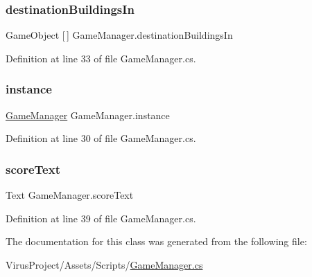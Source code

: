 \subsubsection{\texorpdfstring{destination\+Buildings\+In}{destinationBuildingsIn}}
{\footnotesize\ttfamily Game\+Object \mbox{[}$\,$\mbox{]} Game\+Manager.\+destination\+Buildings\+In}



Definition at line 33 of file Game\+Manager.\+cs.

\hypertarget{class_game_manager_a7666e8468dac197b9eb32dd32128524f}{}\label{class_game_manager_a7666e8468dac197b9eb32dd32128524f} 
\subsubsection{\texorpdfstring{instance}{instance}}
{\footnotesize\ttfamily \hyperlink{class_game_manager}{Game\+Manager} Game\+Manager.\+instance\hspace{0.3cm}{\ttfamily [static]}}



Definition at line 30 of file Game\+Manager.\+cs.

\hypertarget{class_game_manager_a398d163978e15786ef9cea1be1c877d9}{}\label{class_game_manager_a398d163978e15786ef9cea1be1c877d9} 
\subsubsection{\texorpdfstring{score\+Text}{scoreText}}
{\footnotesize\ttfamily Text Game\+Manager.\+score\+Text}



Definition at line 39 of file Game\+Manager.\+cs.



The documentation for this class was generated from the following file\+:\begin{DoxyCompactItemize}
\item 
Virus\+Project/\+Assets/\+Scripts/\hyperlink{_game_manager_8cs}{Game\+Manager.\+cs}\end{DoxyCompactItemize}

